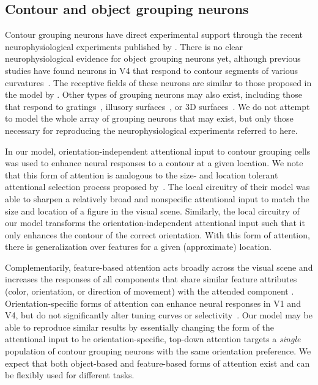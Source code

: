 \subsection{Contour and object grouping neurons}
Contour grouping neurons have direct
experimental support through the recent neurophysiological experiments
published by \cite{Chen_etal14}. 
There is no clear neurophysiological evidence for object
grouping neurons yet,
although previous studies have found neurons in V4 
that respond to contour segments
of various curvatures~\citep{Pasupathy_Connor02,Brincat_Connor04}. The receptive fields of these neurons are
similar to those proposed in the model by
\cite{Craft_etal07}. Other types of grouping neurons may also exist,
including those that respond to 
gratings~\citep{Hegde_vanEssen07}, illusory
surfaces~\citep{Cox_etal13}, or 3D
surfaces~\citep{He_Nakayama95,Hu_etal15a}.
We do not attempt to model the whole array of grouping neurons that may exist, but
only those necessary for reproducing the 
neurophysiological experiments referred to here. 

In our model, orientation-independent attentional input to contour
grouping cells was used to enhance neural responses to a contour at
a given location.
We note that this form of attention is analogous to the
size- and location tolerant attentional selection process
proposed by~\cite{Mihalas_etal11b}. The
local circuitry of their model was able to sharpen a relatively broad
and nonspecific attentional input to match the size and location of a
figure in the visual scene. Similarly, the local circuitry of our
model transforms the orientation-independent attentional input such
that it only enhances the contour of the correct orientation. With
this form of attention, there is generalization over features for a
given (approximate) location.

Complementarily, feature-based attention acts broadly across the
visual scene and increases the responses of all components that share
similar feature attributes (\eg color, orientation, or direction of
movement) with the attended
component \citep{Motter94a,Treue_Trujillo99}.
Orientation-specific forms of attention
can enhance neural
responses in V1 and V4, but do not significantly alter
tuning curves or selectivity~\citep{McAdams_Maunsell99a}. 
Our model may be able to reproduce similar results by essentially changing the
form of the attentional input to be orientation-specific, \ie top-down
attention targets a \emph{single} population of contour grouping
neurons with the same orientation preference.
We expect that both
object-based and feature-based forms of attention exist and can be
flexibly used for different tasks.

